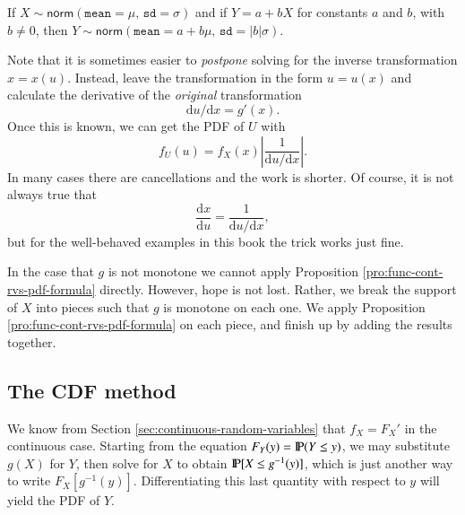\documentclass[captions=tableheading]{scrbook}
\begin{document}
\begin{fact}
\label{fac:lin-trans-norm-is-norm}If \(X\sim\mathsf{norm}(\mathtt{mean}=\mu,\,\mathtt{sd}=\sigma)\) and if \(Y=a+bX\) for constants \(a\) and \(b\), with \(b\neq0\), then \(Y\sim\mathsf{norm}(\mathtt{mean}=a+b\mu,\,\mathtt{sd}=|b|\sigma)\). 
\end{fact}

Note that it is sometimes easier to \emph{postpone} solving for the inverse transformation \(x=x(u)\). Instead, leave the transformation in the form \(u=u(x)\) and calculate the derivative of the \emph{original} transformation
\begin{equation}
\mathrm{d} u/\mathrm{d} x=g'(x).
\end{equation}
Once this is known, we can get the PDF of \(U\) with
\begin{equation}
f_{U}(u)=f_{X}(x)\left|\frac{1}{\mathrm{d} u/\mathrm{d} x}\right|.
\end{equation}
In many cases there are cancellations and the work is shorter. Of course, it is not always true that
\begin{equation}
\frac{\mathrm{d} x}{\mathrm{d} u}=\frac{1}{\mathrm{d} u/\mathrm{d} x},\label{eq:univ-jacob-recip}
\end{equation}
but for the well-behaved examples in this book the trick works just fine.

\begin{rem}
In the case that \(g\) is not monotone we cannot apply Proposition \ref{pro:func-cont-rvs-pdf-formula} directly. However, hope is not lost. Rather, we break the support of \(X\) into pieces such that \(g\) is monotone on each one. We apply Proposition \ref{pro:func-cont-rvs-pdf-formula} on each piece, and finish up by adding the results together.
\end{rem}
\subsection{The CDF method}
\label{sec-6-4-2}


We know from Section \ref{sec:continuous-random-variables} that \(f_{X}=F_{X}'\) in the continuous case. Starting from the equation \(F_{Y}(y)=\P(Y\leq y)\), we may substitute \(g(X)\) for \(Y\), then solve for \(X\) to obtain \(\P[X\leq g^{-1}(y)]\), which is just another way to write \(F_{X}[g^{-1}(y)]\). Differentiating this last quantity with respect to \(y\) will yield the PDF of \(Y\).
\end{document}
